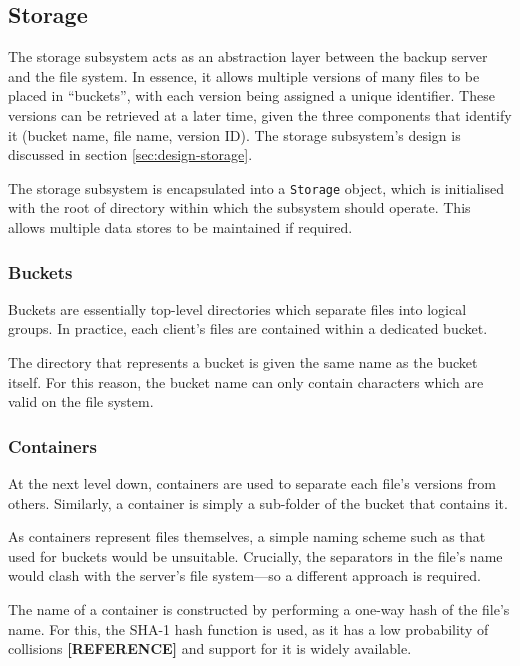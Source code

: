 \subsection{Storage}
\label{sec:implementation-storage}

The storage subsystem acts as an abstraction layer between the backup server
and the file system. In essence, it allows multiple versions of many files to
be placed in ``buckets'', with each version being assigned a unique identifier.
These versions can be retrieved at a later time, given the three components
that identify it (bucket name, file name, version ID). The storage subsystem's
design is discussed in section \ref{sec:design-storage}.

The storage subsystem is encapsulated into a \verb!Storage! object, which is
initialised with the root of directory within which the subsystem should
operate. This allows multiple data stores to be maintained if required.

\subsubsection{Buckets}

Buckets are essentially top-level directories which separate files into logical
groups. In practice, each client's files are contained within a dedicated
bucket.

The directory that represents a bucket is given the same name as the bucket
itself. For this reason, the bucket name can only contain characters which are
valid on the file system.

\subsubsection{Containers}

At the next level down, containers are used to separate each file's versions
from others. Similarly, a container is simply a sub-folder of the bucket that
contains it.

As containers represent files themselves, a simple naming scheme such as that
used for buckets would be unsuitable. Crucially, the separators in the file's
name would clash with the server's file system---so a different approach is
required.

The name of a container is constructed by performing a one-way hash of the
file's name. For this, the SHA-1 hash function is used, as it has a low
probability of collisions \textbf{[REFERENCE]} and support for it is widely
available.


